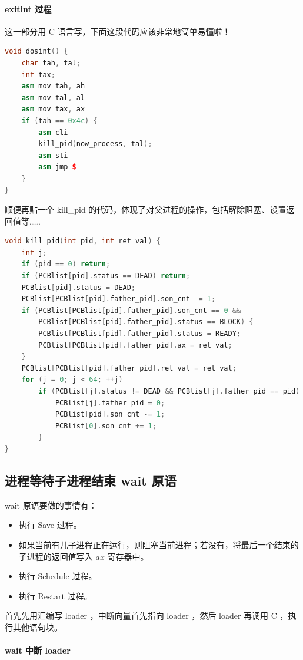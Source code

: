 \documentclass{article}
\begin{document}
\paragraph{exitint 过程}

这一部分用 C 语言写，下面这段代码应该非常地简单易懂啦！

\begin{lstlisting}[language=C++]
void dosint() {
	char tah, tal;
	int tax;
	asm mov tah, ah
	asm mov tal, al
	asm mov tax, ax
	if (tah == 0x4c) {
		asm cli
		kill_pid(now_process, tal);
		asm sti
		asm jmp $
	}
}
\end{lstlisting}

顺便再贴一个 kill\_pid 的代码，体现了对父进程的操作，包括解除阻塞、设置返回值等……

\begin{lstlisting}[language=C++]
void kill_pid(int pid, int ret_val) {
	int j;
	if (pid == 0) return;
	if (PCBlist[pid].status == DEAD) return;
	PCBlist[pid].status = DEAD;
	PCBlist[PCBlist[pid].father_pid].son_cnt -= 1;
	if (PCBlist[PCBlist[pid].father_pid].son_cnt == 0 &&
		PCBlist[PCBlist[pid].father_pid].status == BLOCK) {
		PCBlist[PCBlist[pid].father_pid].status = READY;
		PCBlist[PCBlist[pid].father_pid].ax = ret_val;
	}
	PCBlist[PCBlist[pid].father_pid].ret_val = ret_val;
	for (j = 0; j < 64; ++j)
		if (PCBlist[j].status != DEAD && PCBlist[j].father_pid == pid) {
			PCBlist[j].father_pid = 0;
			PCBlist[pid].son_cnt -= 1;
			PCBlist[0].son_cnt += 1;
		}
}
\end{lstlisting}

\subsection{进程等待子进程结束 wait 原语}

wait 原语要做的事情有：

\begin{itemize}
\item 执行 Save 过程。
\item 如果当前有儿子进程正在运行，则阻塞当前进程；若没有，将最后一个结束的子进程的返回值写入 $ax$ 寄存器中。
\item 执行 Schedule 过程。
\item 执行 Restart 过程。
\end{itemize}

首先先用汇编写 loader ，中断向量首先指向 loader ，然后 loader 再调用 C ，执行其他语句块。

\paragraph{wait 中断 loader}
\end{document}
